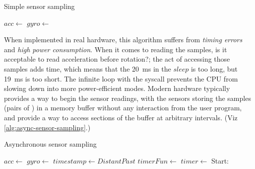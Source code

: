\begin{algorithm}
  \caption{Simple sensor sampling}
  \label{alg:naive-sensor-sampling}
  \DontPrintSemicolon
  $acc \leftarrow$ \;
  $gyro \leftarrow$ \;
  \BlankLine
\end{algorithm} 

When implemented in real hardware, this algorithm suffers from \emph{timing errors} and \emph{high power consumption}. When it comes to reading the samples, is it acceptable to read acceleration before rotation?; the act of accessing those samples adds time, which means that the \SI{20}{\milli\second} in the $sleep$ is too long, but \SI{19}{\milli\second} is too short. The infinite loop with the  syscall prevents the CPU from slowing down into more power-efficient modes. Modern hardware typically provides a way to begin the sensor readings, with the sensors storing the samples (pairs of ) in a memory buffer without any interaction from the user program, and provide a way to access sections of the buffer at arbitrary intervals. (Viz \autoref{alg:async-sensor-sampling}.)

\begin{algorithm}
  \caption{Asynchronous sensor sampling}
  \label{alg:async-sensor-sampling}
  \DontPrintSemicolon
  $acc \leftarrow$ \;
  $gyro \leftarrow$ \;
  $timestamp \leftarrow DistantPast$\;
  $timerFun \leftarrow$ 
  $timer \leftarrow$ \;
  \BlankLine
  Start: 
\end{algorithm} 

